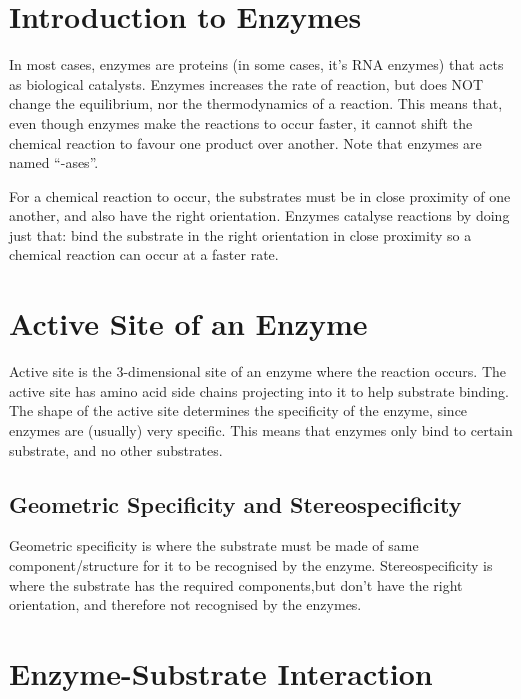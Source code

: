 \section{Introduction to Enzymes}

In most cases, enzymes are proteins (in some cases, it's RNA enzymes) that acts as biological catalysts.
Enzymes increases the rate of reaction, but does NOT change the equilibrium, nor the thermodynamics of a reaction.
This means that, even though enzymes make the reactions to occur faster, it cannot shift the chemical reaction to favour one product over another.
Note that enzymes are named ``-ases''.

For a chemical reaction to occur, the substrates must be in close proximity of one another, and also have the right orientation.
Enzymes catalyse reactions by doing just that: bind the substrate in the right orientation in close proximity so a chemical reaction can occur at a faster rate.

\section{Active Site of an Enzyme}

Active site is the 3-dimensional site of an enzyme where the reaction occurs.
The active site has amino acid side chains projecting into it to help substrate binding.
The shape of the active site determines the specificity of the enzyme, since enzymes are (usually) very specific.
This means that enzymes only bind to certain substrate, and no other substrates.

\subsection{Geometric Specificity and Stereospecificity}

Geometric specificity is where the substrate must be made of same component/structure for it to be recognised by the enzyme.
Stereospecificity is where the substrate has the required components,but don't have the right orientation, and therefore not recognised by the enzymes.

\section{Enzyme-Substrate Interaction}

\begin{center}
\end{center}


